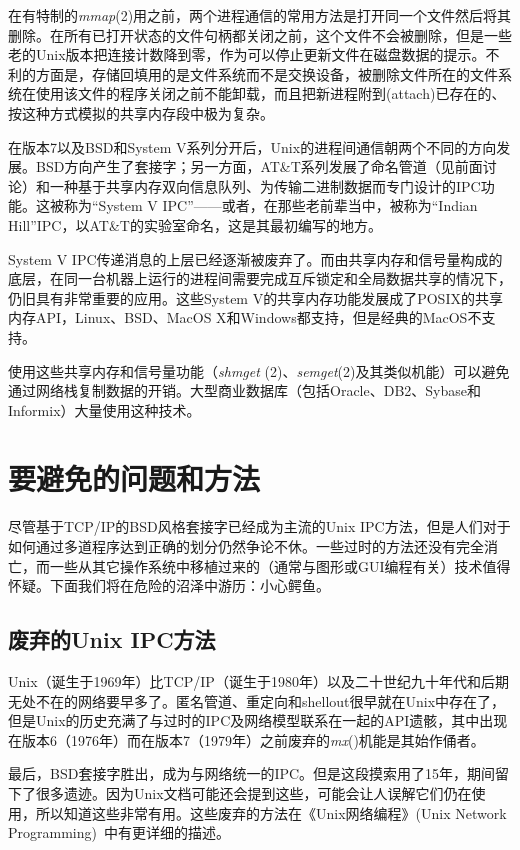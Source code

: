 \documentclass[12pt,oneside]{ctexbook}
\begin{document}
\begin{common-format}
在有特制的\textit{mmap}(2)用之前，两个进程通信的常用方法是打开同一个文件然后将其删除。在所有已打开状态的文件句柄都关闭之前，这个文件不会被删除，但是一些老的Unix版本把连接计数降到零，作为可以停止更新文件在磁盘数据的提示。不利的方面是，存储回填用的是文件系统而不是交换设备，被删除文件所在的文件系统在使用该文件的程序关闭之前不能卸载，而且把新进程附到(attach)已存在的、按这种方式模拟的共享内存段中极为复杂。

在版本7以及BSD和System V系列分开后，Unix的进程间通信朝两个不同的方向发展。BSD方向产生了套接字；另一方面，AT\&{}T系列发展了命名管道（见前面讨论）和一种基于共享内存双向信息队列、为传输二进制数据而专门设计的IPC功能。这被称为“System V IPC”——或者，在那些老前辈当中，被称为“Indian Hill”IPC，以AT\&{}T的实验室命名，这是其最初编写的地方。

System V IPC传递消息的上层已经逐渐被废弃了。而由共享内存和信号量构成的底层，在同一台机器上运行的进程间需要完成互斥锁定和全局数据共享的情况下，仍旧具有非常重要的应用。这些System V的共享内存功能发展成了POSIX的共享内存API，Linux、BSD、MacOS X和Windows都支持，但是经典的MacOS不支持。

使用这些共享内存和信号量功能（\textit{shmget }(2)、\textit{semget}(2)及其类似机能）可以避免通过网络栈复制数据的开销。大型商业数据库（包括Oracle、DB2、Sybase和Informix）大量使用这种技术。



\section{要避免的问题和方法}
尽管基于TCP/IP的BSD风格套接字已经成为主流的Unix IPC方法，但是人们对于如何通过多道程序达到正确的划分仍然争论不休。一些过时的方法还没有完全消亡，而一些从其它操作系统中移植过来的（通常与图形或GUI编程有关）技术值得怀疑。下面我们将在危险的沼泽中游历：小心鳄鱼。


\subsection{废弃的Unix IPC方法}
Unix（诞生于1969年）比TCP/IP（诞生于1980年）以及二十世纪九十年代和后期无处不在的网络要早多了。匿名管道、重定向和shellout很早就在Unix中存在了，但是Unix的历史充满了与过时的IPC及网络模型联系在一起的API遗骸，其中出现在版本6（1976年）而在版本7（1979年）之前废弃的\textit{mx}()机能是其始作俑者。

最后，BSD套接字胜出，成为与网络统一的IPC。但是这段摸索用了15年，期间留下了很多遗迹。因为Unix文档可能还会提到这些，可能会让人误解它们仍在使用，所以知道这些非常有用。这些废弃的方法在《Unix网络编程》(Unix Network Programming)~\cite{Stevens90}中有更详细的描述。


\end{common-format}
\end{document}
